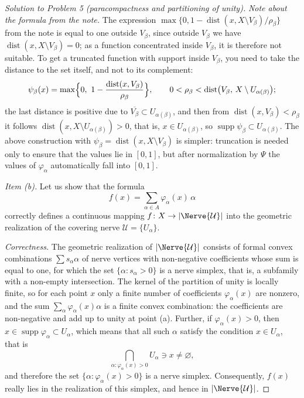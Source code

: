 \documentclass[a4paper,12pt]{report}
\begin{document}
\begin{proof}[Solution to Problem \textup{5} \textup{(}paracompactness and partitioning of unity\textup{)}]
\emph{Note about the formula from the note.} The expression $\max\{0,1-\operatorname{dist}(x,X\setminus V_\beta)/\rho_\beta\}$ from the note is equal to one outside $V_\beta$, since outside $V_\beta$ we have $\operatorname{dist}(x,X\setminus V_\beta)=0$; as a function concentrated inside $V_\beta$, it is therefore not suitable. To get a truncated function with support inside $V_\beta$, you need to take the distance to the set itself, and not to its complement:
\[
\psi_\beta(x)=\max\Bigl\{0,\ 1-\frac{\operatorname{dist}(x,V_\beta)}{\rho_\beta}\Bigr\},
\qquad 0<\rho_\beta<\operatorname{dist}\bigl(V_\beta,\,X\setminus U_{\alpha(\beta)}\bigr);
\]
the last distance is positive due to $\overline{V_\beta}\subset U_{\alpha(\beta)}$, and then from $\operatorname{dist}(x,V_\beta)<\rho_\beta$ it follows $\operatorname{dist}(x,X\setminus U_{\alpha(\beta)})>0$, that is, $x\in U_{\alpha(\beta)}$, so $\operatorname{supp}\psi_\beta\subset U_{\alpha(\beta)}$. The above construction with $\psi_\beta=\operatorname{dist}(x,X\setminus V_\beta)$ is simpler: truncation is needed only to ensure that the values lie in $[0,1]$, but after normalization by $\Psi$ the values of $\varphi_\alpha$ automatically fall into $[0,1]$.

\textit{Item \textup{(b)}.} Let us show that the formula
\[
f(x)=\sum_{\alpha\in A}\varphi_\alpha(x)\,\alpha
\]
correctly defines a continuous mapping $f\colon X\to|\Nerve{\mathcal U}|$ into the geometric realization of the covering nerve $\mathcal U=\{U_\alpha\}$.

\emph{Correctness.} The geometric realization of $|\Nerve{\mathcal U}|$ consists of formal convex combinations $\sum s_\alpha\alpha$ of nerve vertices with non-negative coefficients whose sum is equal to one, for which the set $\{\alpha\colon s_\alpha>0\}$ is a nerve simplex, that is, a subfamily with a non-empty intersection. The kernel of the partition of unity is locally finite, so for each point $x$ only a finite number of coefficients $\varphi_\alpha(x)$ are nonzero, and the sum $\sum_\alpha\varphi_\alpha(x)\alpha$ is a finite convex combination: the coefficients are non-negative and add up to unity at point \textup{(a)}. Further, if $\varphi_\alpha(x)>0$, then $x\in\operatorname{supp}\varphi_\alpha\subset U_\alpha$, which means that all such $\alpha$ satisfy the condition $x\in U_\alpha$, that is
\[
\bigcap_{\alpha\colon\varphi_\alpha(x)>0}U_\alpha\ni x\ne\varnothing ,
\]
and therefore the set $\{\alpha\colon\varphi_\alpha(x)>0\}$ is a nerve simplex. Consequently, $f(x)$ really lies in the realization of this simplex, and hence in $|\Nerve{\mathcal U}|$.


\end{proof}
\end{document}

